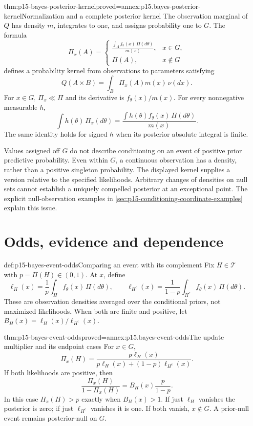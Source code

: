 \begin{hbtheorem}{thm:p15-bayes-posterior-kernel}{proved=annex:p15.bayes-posterior-kernel}{Normalization and a complete posterior kernel}
The observation marginal of \(Q\) has density \(m\), integrates to one,
and assigns probability one to \(G\). The formula
\[
 \Pi_x(A)=
 \begin{cases}
 \displaystyle\frac{\int_A f_\theta(x)\,\Pi(d\theta)}{m(x)},&x\in G,\\
 \Pi(A),&x\notin G
 \end{cases}
\]
defines a probability kernel from observations to parameters satisfying
\[
 Q(A\times B)=\int_B\Pi_x(A)m(x)\,\nu(dx).
\]
For \(x\in G\), \(\Pi_x\ll\Pi\) and its derivative is
\(f_\theta(x)/m(x)\). For every nonnegative measurable \(h\),
\[
 \int h(\theta)\,\Pi_x(d\theta)
   =\frac{\int h(\theta)f_\theta(x)\,\Pi(d\theta)}{m(x)}.
\]
The same identity holds for signed \(h\) when its posterior absolute
integral is finite.
\end{hbtheorem}

Values assigned off \(G\) do not describe conditioning on an event
of positive prior predictive probability. Even within \(G\), a
continuous observation has a density, rather than a positive singleton
probability. The displayed kernel supplies a version relative to the
specified likelihoods. Arbitrary changes of densities on null sets
cannot establish a uniquely compelled posterior at an exceptional
point. The explicit null-observation examples in
\cref{sec:p15-conditioning-coordinate-examples} explain this issue.

\section{Odds, evidence and dependence}
\label{sec:p15-bayes-odds}

\begin{hbdefinition}{def:p15-bayes-event-odds}{Comparing an event with its complement}
Fix \(H\in\mathcal T\) with \(p=\Pi(H)\in(0,1)\). At \(x\), define
\[
 \ell_H(x)=\frac1p\int_H f_\theta(x)\,\Pi(d\theta),\qquad
 \ell_{H^c}(x)=\frac1{1-p}\int_{H^c}f_\theta(x)\,\Pi(d\theta).
\]
These are observation densities averaged over the conditional priors,
not maximized likelihoods. When both are finite and positive, let
\(B_H(x)=\ell_H(x)/\ell_{H^c}(x)\).
\end{hbdefinition}

\begin{hbtheorem}{thm:p15-bayes-event-odds}{proved=annex:p15.bayes-event-odds}{The update multiplier and its endpoint cases}
For \(x\in G\),
\[
 \Pi_x(H)=\frac{p\ell_H(x)}
                 {p\ell_H(x)+(1-p)\ell_{H^c}(x)}.
\]
If both likelihoods are positive, then
\[
 \frac{\Pi_x(H)}{1-\Pi_x(H)}
       =B_H(x)\frac p{1-p}.
\]
In this case \(\Pi_x(H)>p\) exactly when \(B_H(x)>1\).
If just \(\ell_H\) vanishes the posterior is zero; if just
\(\ell_{H^c}\) vanishes it is one. If both vanish, \(x\notin G\).
A prior-null event remains posterior-null on \(G\).
\end{hbtheorem}

